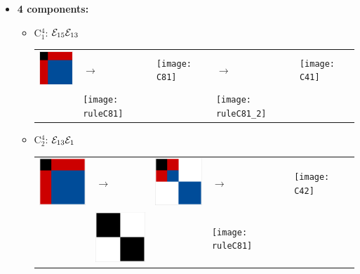 \begin{itemize}
\item \textbf{4 components:} \newline
\begin{itemize}
\item C$_1^4$: $\mathcal{E}_{15}\mathcal{E}_{13}$\newline
\begin{tabular}{m{2cm} m{2cm} m{2cm} m{2cm} m{2cm}}
\includegraphics[width=2.2cm]{img-JA/id}  
& \hspace{0.8cm}$\longrightarrow$ 
& \texttt{[image: C81]} 
& \hspace{0.8cm}$\longrightarrow$ 
& \texttt{[image: C41]}\\ 
 & \texttt{[image: ruleC81]} &  
 & \texttt{[image: ruleC81\_2]} &\\ 
\end{tabular} 

\item C$_2^4$: $\mathcal{E}_{13}\mathcal{E}_1$\newline
\begin{tabular}{m{2cm} m{2cm} m{2cm} m{2cm} m{2cm}}
\includegraphics[width=2.2cm]{img-JA/id}  
& \hspace{0.8cm}$\longrightarrow$ 
& \includegraphics[width=2.2cm]{img-JA/8comp} 
& \hspace{0.8cm}$\longrightarrow$ 
& \texttt{[image: C42]}\\ 
 & \includegraphics[width=2.2cm]{img-JA/16To8} &  
 & \texttt{[image: ruleC81]} &\\ 
\end{tabular} 


\end{itemize}
\end{itemize}
